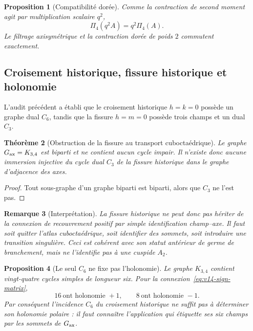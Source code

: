 \documentclass[11pt,a4paper]{article}
\newtheorem{theorem}{Théorème}[section]
\newtheorem{proposition}[theorem]{Proposition}
\newtheorem{remark}[theorem]{Remarque}
\begin{document}
\begin{proposition}[Compatibilité dorée]\label{prop:v14-Reynolds-golden}
Comme la contraction de second moment agit par multiplication scalaire $q^2$,
\[
 \boxed{
 \Pi_4(q^2A)=q^2\Pi_4(A).}
\]
Le filtrage axisymétrique et la contraction dorée de poids $2$ commutent exactement.
\end{proposition}

\subsection{Croisement historique, fissure historique et holonomie}

L'audit précédent a établi que le croisement historique $h=k=0$ possède un graphe dual $C_6$, tandis que la fissure $h=m=0$ possède trois champs et un dual $C_3$.

\begin{theorem}[Obstruction de la fissure au transport cuboctaédrique]\label{thm:v14-fissure-bipartite}
Le graphe $G_{\rm ax}=K_{3,4}$ est biparti et ne contient aucun cycle impair. Il n'existe donc aucune immersion injective du cycle dual $C_3$ de la fissure historique dans le graphe d'adjacence des axes.
\end{theorem}

\begin{proof}
Tout sous-graphe d'un graphe biparti est biparti, alors que $C_3$ ne l'est pas.
\end{proof}

\begin{remark}[Interprétation]
La fissure historique ne peut donc pas hériter de la connexion de recouvrement positif par simple identification champ--axe. Il faut soit quitter l'atlas cuboctaédrique, soit identifier des sommets, soit introduire une transition singulière. Ceci est cohérent avec son statut antérieur de germe de branchement, mais ne l'identifie pas à une cuspide $A_2$.
\end{remark}

\begin{proposition}[Le seul $C_6$ ne fixe pas l'holonomie]\label{prop:v14-C6-holonomy}
Le graphe $K_{3,4}$ contient vingt-quatre cycles simples de longueur six. Pour la connexion~\eqref{eq:v14-sign-matrix},
\[
 \boxed{
 16\ \text{ont holonomie }+1,
 \qquad
 8\ \text{ont holonomie }-1.}
\]
Par conséquent l'incidence $C_6$ du croisement historique ne suffit pas à déterminer son holonomie polaire : il faut connaître l'application qui étiquette ses six champs par les sommets de $G_{\rm ax}$.
\end{proposition}
\end{document}

